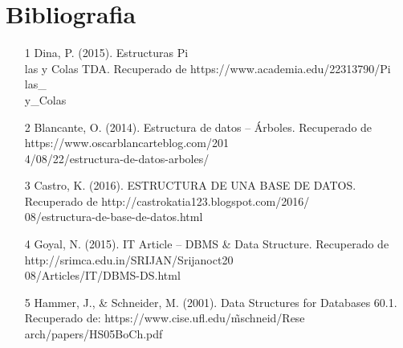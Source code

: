 \documentclass[twoside,twocolumn]{article}
\begin{document}
\section{Bibliografia}\label{sec:7}
\begin{itemize}
\item [1] Dina, P. (2015). Estructuras Pi\\las y Colas TDA. Recuperado de https://www.academia.edu/22313790/Pi\\las\_\\y\_Colas \\
\item [2] Blancante, O. (2014). Estructura de datos – Árboles. Recuperado de https://www.oscarblancarteblog.com/201\\4/08/22/estructura-de-datos-arboles/\\
\item [3] Castro, K. (2016). ESTRUCTURA DE UNA BASE DE DATOS. Recuperado de http://castrokatia123.blogspot.com/2016/\\08/estructura-de-base-de-datos.html\\
\item [4] Goyal, N. (2015). IT Article -- DBMS \& Data Structure. Recuperado de http://srimca.edu.in/SRIJAN/Srijanoct20\\08/Articles/IT/DBMS-DS.html\\
\item [5] Hammer, J., \& Schneider, M. (2001). Data Structures for Databases 60.1. Recuperado de: https://www.cise.ufl.edu/\~mschneid/Rese\\arch/papers/HS05BoCh.pdf\\
\end{itemize}


\end{document}
